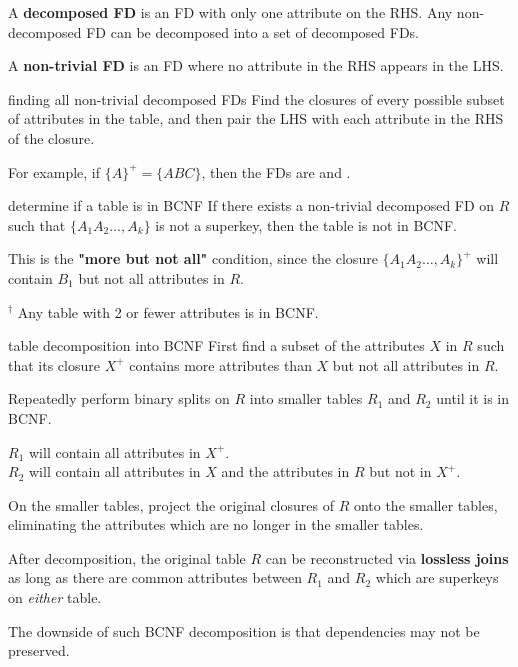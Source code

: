 A \textbf{decomposed FD} is an FD with only one attribute on the RHS.
Any non-decomposed FD can be decomposed into a set of decomposed FDs.

A \textbf{non-trivial FD} is an FD where no attribute in the RHS appears in the LHS.

\begin{defn}{finding all non-trivial decomposed FDs}
    Find the closures of every possible subset of attributes in the table, and then pair the LHS with each attribute in the RHS of the closure.

    For example, if $\{ A \}^+ = \{ ABC \}$, then the FDs are  and .
\end{defn}

\begin{defn}{determine if a table is in BCNF}
    If there exists a non-trivial decomposed FD  on $R$ such that $\{ A_1 A_2 \dots, A_k \}$ is not a superkey, then the table is not in BCNF.

    This is the \textbf{"more but not all"} condition, since the closure $\{ A_1 A_2 \dots, A_k \}^+$ will contain $B_1$ but not all attributes in $R$.

    $^\dagger$ Any table with 2 or fewer attributes is in BCNF.
\end{defn}

\begin{defn}{table decomposition into BCNF}
    First find a subset of the attributes $X$ in $R$ such that its closure $X^+$ contains more attributes than $X$ but not all attributes in $R$.

    Repeatedly perform binary splits on $R$ into smaller tables $R_1$ and $R_2$ until it is in BCNF.

    $R_1$ will contain all attributes in $X^+$. \\
    $R_2$ will contain all attributes in $X$ and the attributes in $R$ but not in $X^+$.

    On the smaller tables, project the original closures of $R$ onto the smaller tables, eliminating the attributes which are no longer in the smaller tables.
\end{defn}

After decomposition, the original table $R$ can be reconstructed via \textbf{lossless joins} as long as there are common attributes between $R_1$ and $R_2$ which are superkeys on \textit{either} table.

The downside of such BCNF decomposition is that dependencies may not be preserved.


